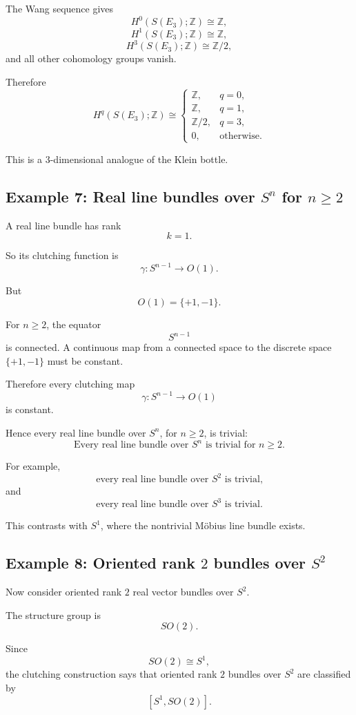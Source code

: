\documentclass[12pt,a4paper]{article}
\theoremstyle{notespace}
\begin{document}
The Wang sequence gives
\[
H^0(S(E_3);\mathbb{Z})\cong \mathbb{Z},
\]
\[
H^1(S(E_3);\mathbb{Z})\cong \mathbb{Z},
\]
\[
H^3(S(E_3);\mathbb{Z})\cong \mathbb{Z}/2,
\]
and all other cohomology groups vanish.

Therefore
\[
\boxed{
	H^q(S(E_3);\mathbb{Z})
	\cong
	\begin{cases}
		\mathbb{Z}, & q=0,\\[2mm]
		\mathbb{Z}, & q=1,\\[2mm]
		\mathbb{Z}/2, & q=3,\\[2mm]
		0, & \text{otherwise}.
	\end{cases}
}
\]

This is a \(3\)-dimensional analogue of the Klein bottle.

\subsection{Example 7: Real line bundles over \(S^n\) for \(n\geq 2\)}

A real line bundle has rank
\[
k=1.
\]

So its clutching function is
\[
\gamma:S^{n-1}\to O(1).
\]

But
\[
O(1)=\{+1,-1\}.
\]

For \(n\geq 2\), the equator
\[
S^{n-1}
\]
is connected. A continuous map from a connected space to the discrete space \(\{+1,-1\}\) must be constant.

Therefore every clutching map
\[
\gamma:S^{n-1}\to O(1)
\]
is constant.

Hence every real line bundle over \(S^n\), for \(n\geq 2\), is trivial:
\[
\boxed{
	\text{Every real line bundle over }S^n\text{ is trivial for }n\geq 2.
}
\]

For example,
\[
\text{every real line bundle over }S^2\text{ is trivial,}
\]
and
\[
\text{every real line bundle over }S^3\text{ is trivial.}
\]

This contrasts with \(S^1\), where the nontrivial M\"obius line bundle exists.

\subsection{Example 8: Oriented rank \(2\) bundles over \(S^2\)}

Now consider oriented rank \(2\) real vector bundles over \(S^2\).

The structure group is
\[
SO(2).
\]

Since
\[
SO(2)\cong S^1,
\]
the clutching construction says that oriented rank \(2\) bundles over \(S^2\) are classified by
\[
[S^1,SO(2)].
\]
\end{document}
